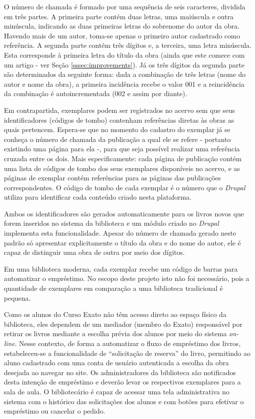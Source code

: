 \documentclass[a4paper]{article}
\begin{document}
O número de chamada é formado por uma sequência de seis caracteres, dividida em três partes. A primeira parte contém duas letras, uma maiúscula e outra minúscula, indicando as duas primeiras letras do sobrenome do autor da obra. Havendo mais de um autor, toma-se apenas o primeiro autor cadastrado como referência. A segunda parte contém três dígitos e, a terceira, uma letra minúscula. Esta corresponde à primeira letra do título da obra (ainda que este comece com um artigo - ver Seção \ref{sssec:improvements}). Já os três dígitos da segunda parte são determinados da seguinte forma: dada a combinação de três letras (nome do autor e nome da obra), a primeira incidência recebe o valor 001 e a reincidência da combinação é autoincrementada (002 e assim por diante).

Em contrapartida, exemplares podem ser registrados no acervo sem que seus identificadores (códigos de tombo) contenham referências diretas às obras as quais pertencem. Espera-se que no momento do cadastro do exemplar já se conheça o número de chamada da publicação a qual ele se refere - portanto existindo uma página para ela -, para que seja possível realizar uma referência cruzada entre os dois. Mais especificamente: cada página de publicação contém uma lista de códigos de tombo dos seus exemplares disponíveis no acervo, e as páginas de exemplar contém referências para as páginas das publicações correspondentes. O código de tombo de cada exemplar é o número que o \textit{Drupal} utiliza para identificar cada conteúdo criado nesta plataforma.

Ambos os identificadores são gerados automaticamente para os livros novos que forem inseridos no sistema da biblioteca e um módulo criado no \textit{Drupal} implementa esta funcionalidade. Apesar do número de chamada gerado neste padrão só apresentar explicitamente o título da obra e do nome do autor, ele é capaz de distinguir uma obra de outra por meio dos dígitos.

Em uma biblioteca moderna, cada exemplar recebe um código de barras para automatizar o empréstimo. No escopo deste projeto isto não foi necessário, pois a quantidade de exemplares em comparação a uma biblioteca tradicional é pequena.

Como os alunos do Curso Exato não têm acesso direto ao espaço físico da biblioteca, eles dependem de um mediador (membro do Exato) responsável por retirar os livros mediante a escolha prévia dos alunos por meio do sistema \textit{on-line}.  Nesse contexto, de forma a automatizar o fluxo de empréstimo dos livros, estabeleceu-se a funcionalidade de “solicitação de reserva” do livro, permitindo ao aluno cadastrado com uma conta de usuário autenticada a escolha da obra desejada ao navegar no site. Os administradores da biblioteca são notificados desta intenção de empréstimo e deverão levar os respectivos exemplares para a sala de aula. O bibliotecário é capaz de acessar uma tela administrativa no sistema com o histórico das solicitações dos alunos e com botões para efetivar o empréstimo ou cancelar o pedido.
\end{document}
